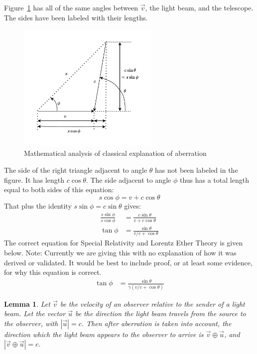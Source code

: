 \documentclass[a4paper]{article}
\theoremstyle{plain}
\newtheorem{lemma}[theorem]{Lemma}
\theoremstyle{definition}
\newcommand{\vect}[1]{\vec{#1}}
\begin{document}
Figure~\ref{fig:classical-aberration-analysis} has all of the same
angles between $\vect{v}$, the light beam, and the telescope.  The
sides have been labeled with their lengths.
\begin{figure}[ht]
	\centering
	\includegraphics[width=0.6\textwidth]{classical-aberration-analysis.pdf}
	\caption{Mathematical analysis of classical explanation of aberration}
	\label{fig:classical-aberration-analysis}
\end{figure}
The side of the right triangle adjacent to angle $\theta$ has not been
labeled in the figure.  It has length $c \cos \theta$.
The side adjacent to angle $\phi$ thus has a total length equal to
both sides of this equation:
\begin{equation}
s \cos \phi = v + c \cos \theta \nonumber
\end{equation}
That plus the identity $s \sin \phi = c \sin \theta$ gives:
\begin{align}
\frac{s \sin \phi}{s \cos \phi} & = \frac{c \sin \theta}{v + c \cos \theta} \nonumber \\
\tan \phi & = \frac{\sin \theta}{v/c + \cos \theta} \label{eqn:classical-aberration-angle}
\end{align}
The correct equation for Special Relativity and Lorentz Ether Theory
is given below.  Note: Currently we are giving this with no
explanation of how it was derived or validated.  It would be best to
include proof, or at least some evidence, for why this equation is
correct.
\begin{align}
\tan \phi & = \frac{\sin \theta}{\gamma(v/c + \cos \theta)} \label{eqn:aberration-angle}
\end{align}

\begin{lemma}
\label{lem:aberrationByRelVelAdd}
Let $\vect{v}$ be the velocity of an observer relative to
the sender of a light beam.
Let the vector $\vect{u}$ be the direction the light beam
travels from the source to the observer, with $|\vect{u}|=c$.
Then after aberration is taken into account, the direction which the
light beam appears to the observer to arrive is
$\vect{v} \oplus \vect{u}$,
and $|\vect{v} \oplus \vect{u}| = c$.
\end{lemma}
\end{document}

